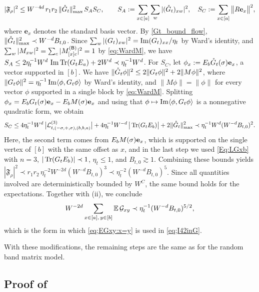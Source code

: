 \begin{itemize}
\[ |\mathfrak F_\rho|^2\le W^{-4d}\,r_1r_2\,\|{\mathring G}_t\|_{\max}^2\,S_AS_C,\qquad S_A:=\sum_{x\in[a]}\sum_{w}|({\mathring G}_t)_{xw}|^2,\quad S_C:=\sum_{x\in[a]}\big\|R\mathbf e_x\big\|^2 , \]
where $\mathbf e_x$ denotes the standard basis vector. By \eqref{Gt_bound_flow}, $\|{\mathring G}_t\|_{\max}^2\prec W^{-d}B_{t,0}$. Since $\sum_w|(G_t)_{xw}|^2=\operatorname{{\mathrm{Im}}} (G_t)_{xx}/\eta_t$ by Ward's identity, and $\sum_w|M_{xw}|^2=\sum_c|M^{({\mathsf{B}})}_{[x]c}|^2=1$ by \eqref{eq:WardM}, we have $S_A\le 2\eta_t^{-1}W^d\,\operatorname{{\mathrm{Im}}}\operatorname{Tr}(G_tE_a)+2W^d\prec\eta_t^{-1}W^d$. For $S_C$, let $\phi_x:=E_b{\mathring G}_t(\sigma)\mathbf e_x$, a vector supported in $[b]$. We have $\|{\mathring G}_t\phi\|^2\le 2\|G_t\phi\|^2+2\|M\phi\|^2$, where $\|G_t\phi\|^2=\eta_t^{-1}\operatorname{{\mathrm{Im}}}\langle\phi,G_t\phi\rangle$ by Ward's identity, and $\|M\phi\|=\|\phi\|$ for every vector $\phi$ supported in a single block by \eqref{eq:WardM}. Splitting $\phi_x=E_bG_t(\sigma)\mathbf e_x-E_bM(\sigma)\mathbf e_x$ and using that $\phi\mapsto\operatorname{{\mathrm{Im}}}\langle\phi,G_t\phi\rangle$ is a nonnegative quadratic form, we obtain
\[ S_C\le 4\eta_t^{-1}W^{d}\,\big|\mathcal L^{(3)}_{t,(-\sigma,+,\sigma),(b,b,a)}\big|+4\eta_t^{-1}W^{-d}\,\big|\operatorname{Tr}(G_tE_b)\big|+2\|{\mathring G}_t\|_{\max}^2\prec \eta_t^{-1}W^d(W^{-d}B_{t,0})^2 . \]
Here, the second term comes from $E_bM(\sigma)\mathbf e_x$, which is supported on the single vertex of $[b]$ with the same offset as $x$, and in the last step we used \eqref{Eq:LGxb} with $n=3$, $|\operatorname{Tr}(G_tE_b)|\prec 1$, $\eta_t\le 1$, and $B_{t,0}\gtrsim 1$. Combining these bounds yields $|\mathfrak F_\rho|^2\prec r_1r_2\,\eta_t^{-2}W^{-2d}(W^{-d}B_{t,0})^3\prec \eta_t^{-2}(W^{-d}B_{t,0})^5$. Since all quantities involved are deterministically bounded by $W^C$, the same bound holds for the expectations. Together with (ii), we conclude
\[ W^{-2d}\sum_{x\in[a],\,y\in[b]}\mathbb{E}\,\mathcal G_{xy}\prec \eta_t^{-1}(W^{-d}B_{t,0})^{5/2}, \]
which is the form in which \eqref{eq;EGxy:x=y} is used in \eqref{eq;I42inG}.
\end{itemize}
With these modifications, the remaining steps are the same as for the random band matrix model.



\subsection{Proof of \texorpdfstring{}{Lemma localregular}}\label{sec:pflocalregular}


